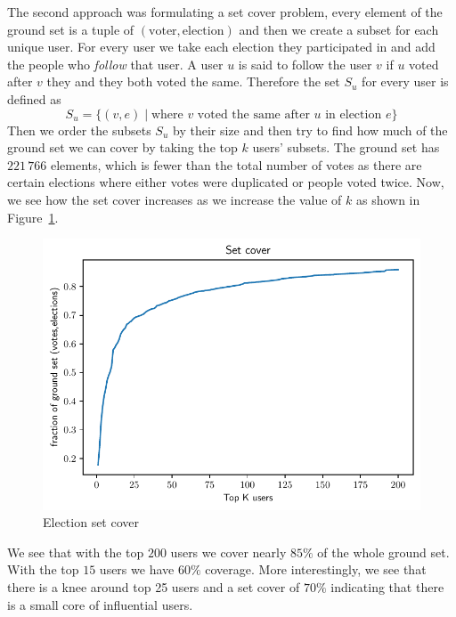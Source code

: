 The second approach was formulating a set cover problem, every element of the ground set is a tuple of $(\text{voter},\text{election})$ and then we create a subset for each unique user. For every user we take each election they participated in and add the people who \textit{follow} that user. A user $u$ is said to follow the user $v$ if $u$ voted after $v$ they and they both voted the same. Therefore the set $S_u$ for every user is defined as 
\[
    S_{u} = \{(v,e) \mid \text{where } v \text{ voted the same after } u \text{ in election }e  \} 
\]
Then we order the subsets $S_u$ by their size and then try to find how much of the ground set we can cover by taking the top $k$ users' subsets. The ground set has $221\,766$ elements, which is fewer than the total number of votes as there are certain elections where either votes were duplicated or people voted twice. Now, we see how the set cover increases as we increase the value of $k$ as shown in Figure~\ref{fig:set-cover}.
\begin{figure}[!ht]
    \centering
    \includegraphics[width=\linewidth]{images/set_cover.pdf}
    \caption{Election set cover}
    \label{fig:set-cover}
\end{figure}
We see that with the top $200$ users we cover nearly $85\%$ of the whole ground set. With the top $15$ users we have $60\%$ coverage. More interestingly, we see that there is a knee around top 25 users and a set cover of $70\%$ indicating that there is a small core of influential users.  

